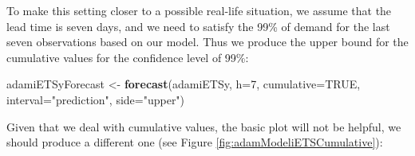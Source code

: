 \documentclass[]{book}
\newenvironment{Shaded}{\begin{snugshade}}{\end{snugshade}}
\newcommand{\DataTypeTok}[1]{\textcolor[rgb]{0.13,0.29,0.53}{#1}}
\newcommand{\DecValTok}[1]{\textcolor[rgb]{0.00,0.00,0.81}{#1}}
\newcommand{\KeywordTok}[1]{\textcolor[rgb]{0.13,0.29,0.53}{\textbf{#1}}}
\newcommand{\NormalTok}[1]{#1}
\newcommand{\OperatorTok}[1]{\textcolor[rgb]{0.81,0.36,0.00}{\textbf{#1}}}
\newcommand{\OtherTok}[1]{\textcolor[rgb]{0.56,0.35,0.01}{#1}}
\newcommand{\StringTok}[1]{\textcolor[rgb]{0.31,0.60,0.02}{#1}}
\theoremstyle{definition}
\theoremstyle{definition}
\theoremstyle{definition}
\theoremstyle{definition}
\theoremstyle{remark}
\begin{document}
To make this setting closer to a possible real-life situation, we assume that the lead time is seven days, and we need to satisfy the 99\% of demand for the last seven observations based on our model. Thus we produce the upper bound for the cumulative values for the confidence level of 99\%:

\begin{Shaded}
\begin{Highlighting}[]
\NormalTok{adamiETSyForecast <-}\StringTok{ }\KeywordTok{forecast}\NormalTok{(adamiETSy, }\DataTypeTok{h=}\DecValTok{7}\NormalTok{,}
                              \DataTypeTok{cumulative=}\OtherTok{TRUE}\NormalTok{,}
                              \DataTypeTok{interval=}\StringTok{"prediction"}\NormalTok{,}
                              \DataTypeTok{side=}\StringTok{"upper"}\NormalTok{)}
\end{Highlighting}
\end{Shaded}

Given that we deal with cumulative values, the basic plot will not be helpful, we should produce a different one (see Figure \ref{fig:adamModeliETSCumulative}):

\begin{Shaded}
\end{Shaded}
\end{document}
